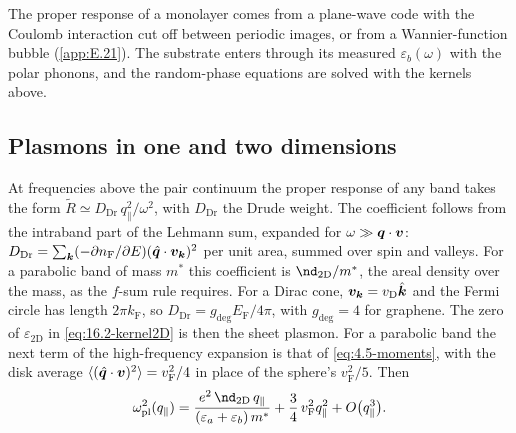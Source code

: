 The proper response of a monolayer comes from a plane-wave code with the Coulomb interaction cut off between periodic images, or from a Wannier-function bubble (\cref{app:E.21}). The substrate enters through its measured $\varepsilon_b(\omega)$ with the polar phonons, and the random-phase equations are solved with the kernels above.

\subsection{Plasmons in one and two dimensions}\label{sec:16.2-plasmons}

At frequencies above the pair continuum the proper response of any band takes the form $\tilde R \simeq D_{\mathrm{Dr}}\,q_\parallel^2/\omega^2$, with $D_{\mathrm{Dr}}$ the Drude weight. The coefficient follows from the intraband part of the Lehmann sum, expanded for $\omega \gg \bm{q}\cdot\bm{v}$: $D_{\mathrm{Dr}} = \sum_{\bm{k}}(-\partial n_{\mathrm{F}}/\partial E)(\hat{\bm{q}}\cdot\bm{v}_{\bm{k}})^2$ per unit area, summed over spin and valleys. For a parabolic band of mass $m^*$ this coefficient is $\nd_{\mathrm{2D}}/m^*$, the areal density over the mass, as the $f$-sum rule requires. For a Dirac cone, $\bm{v}_{\bm{k}} = v_{\mathrm{D}}\hat{\bm{k}}$ and the Fermi circle has length $2\pi k_{\mathrm{F}}$, so $D_{\mathrm{Dr}} = g_{\mathrm{deg}}E_{\mathrm{F}}/4\pi$, with $g_{\mathrm{deg}} = 4$ for graphene. The zero of $\varepsilon_{\mathrm{2D}}$ in \cref{eq:16.2-kernel2D} is then the sheet plasmon. For a parabolic band the next term of the high-frequency expansion is that of \cref{eq:4.5-moments}, with the disk average $\langle(\hat{\bm{q}}\cdot\bm{v})^2\rangle = v_{\mathrm{F}}^2/4$ in place of the sphere's $v_{\mathrm{F}}^2/5$. Then
\begin{equation}
  \omega_{\mathrm{pl}}^2(q_\parallel) = \frac{e^2\,\nd_{\mathrm{2D}}\,q_\parallel}{(\varepsilon_a + \varepsilon_b)\,m^*} + \frac34\,v_{\mathrm{F}}^2q_\parallel^2 + O\bigl(q_\parallel^3\bigr) .
  \label{eq:16.2-2Dpl}
\end{equation}
